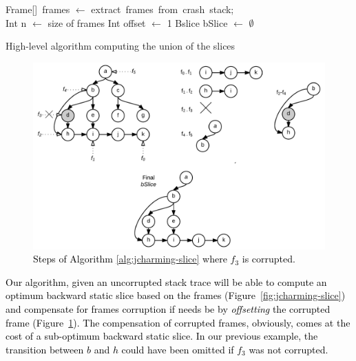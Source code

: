 \documentclass[times, doublespace]{smrauth}
\newcommand{\red}[1]{\textcolor{black}{#1}}
\begin{document}
{\vspace*{0.3cm}

\begin{algorithm}
 Frame[]~frames $\leftarrow$ extract~frames~from~crash~stack; \\
 Int n $\leftarrow$ size of frames\;
 Int offset $\leftarrow$ 1\;
 Bslice bSlice $\leftarrow$ $\emptyset$\;
\caption{High-level algorithm computing the union of the slices\label{alg:jcharming-slice}}
\end{algorithm}

\vspace*{0.3cm}


\begin{figure}
  \centering
    \includegraphics[scale=.20]{media/algo.png}
    \caption{\red{Steps of Algorithm \ref{alg:jcharming-slice} where $f_3$ is corrupted.}
    \label{fig:jcharming-algo}}
\end{figure}

\red{Our algorithm, given an uncorrupted stack trace will be able to compute an optimum backward static slice based on the frames (Figure~\ref{fig:jcharming-slice}) and compensate for frames corruption if needs be by \textit{offsetting} the corrupted frame (Figure~\ref{fig:jcharming-algo}).
The compensation of corrupted frames, obviously, comes at the cost of a sub-optimum backward static slice.
In our previous example, the transition between $b$ and $h$ could have been omitted if $f_3$ was not corrupted.
}


}
\end{document}

